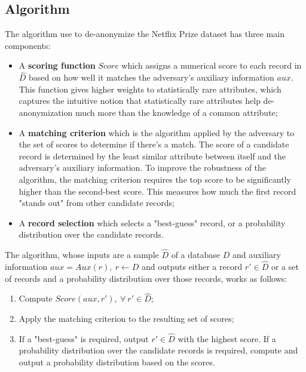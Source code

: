 \documentclass[conference]{IEEEtran}
\begin{document}
\subsection{Algorithm} \label{sec:alg}

The algorithm use to de-anonymize the Netflix Prize dataset has three main components:

\begin{itemize}
    \item A \textbf{scoring function} $Score$ which assigns a numerical score to each record in 
    $\hat{D}$ based on how well it matches the adversary's auxiliary information $aux$. This function 
    gives higher weights to statistically rare attributes, which captures the intuitive notion that 
    statistically rare attributes help de-anonymization much more than the knowledge of a common 
    attribute;

    \item A \textbf{matching criterion} which is the algorithm applied by the adversary to the set 
    of scores to determine if there's a match. The score of a candidate record is determined by the 
    least similar attribute between itself and the adversary's auxiliary information. To improve 
    the robustness of the algorithm, the matching criterion requires the top score to be significantly 
    higher than the second-best score. This measures how much the first record "stands out" from
    other candidate records;

    \item A \textbf{record selection} which selects a "best-guess" record, or a probability 
    distribution over the candidate records.
\end{itemize}

The algorithm, whose inputs are a sample $\hat{D}$ of a database $D$ and auxiliary information $aux 
= Aux(r), \ r \leftarrow D$ and outputs either a record $r' \in \hat{D}$ or a set of records and a 
probability distribution over those records, works as follows:

\begin{enumerate}
    \item Compute $Score(aux, r'), \ \forall \ r' \in \hat{D}$;

    \item Apply the matching criterion to the resulting set of scores;
    
    \item If a "best-guess" is required, output $r' \in \hat{D}$ with the highest score. If a 
    probability distribution over the candidate records is required, compute and output a
    probability distribution based on the scores.
\end{enumerate}
\end{document}
